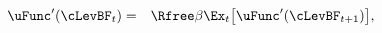   \begin{eqnarray*}
    \uFunc^{\prime}(\cLevBF_{t}) & = & \Rfree\beta \Ex_{t}\big[\uFunc^{\prime}(\cLevBF_{t+1})\big], \label{eq:QuadEuler}
  \end{eqnarray*}
